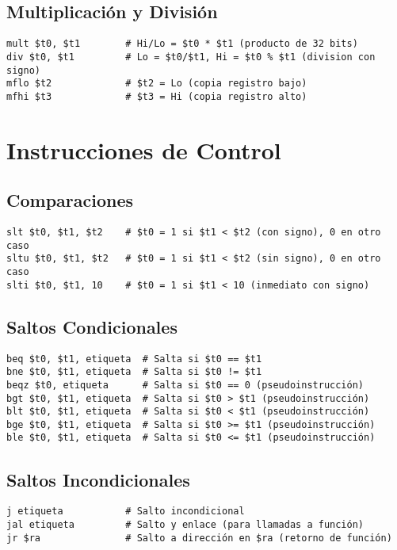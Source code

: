 \documentclass{article}
\begin{document}
\subsection{Multiplicación y División}
\begin{lstlisting}[language={[mips]Assembler}]
mult $t0, $t1        # Hi/Lo = $t0 * $t1 (producto de 32 bits)
div $t0, $t1         # Lo = $t0/$t1, Hi = $t0 % $t1 (division con signo)
mflo $t2             # $t2 = Lo (copia registro bajo)
mfhi $t3             # $t3 = Hi (copia registro alto)
\end{lstlisting}

\section{Instrucciones de Control}

\subsection{Comparaciones}
\begin{lstlisting}[language={[mips]Assembler}]
slt $t0, $t1, $t2    # $t0 = 1 si $t1 < $t2 (con signo), 0 en otro caso
sltu $t0, $t1, $t2   # $t0 = 1 si $t1 < $t2 (sin signo), 0 en otro caso
slti $t0, $t1, 10    # $t0 = 1 si $t1 < 10 (inmediato con signo)
\end{lstlisting}

\subsection{Saltos Condicionales}
\begin{lstlisting}[language={[mips]Assembler}]
beq $t0, $t1, etiqueta  # Salta si $t0 == $t1
bne $t0, $t1, etiqueta  # Salta si $t0 != $t1
beqz $t0, etiqueta      # Salta si $t0 == 0 (pseudoinstrucción)
bgt $t0, $t1, etiqueta  # Salta si $t0 > $t1 (pseudoinstrucción)
blt $t0, $t1, etiqueta  # Salta si $t0 < $t1 (pseudoinstrucción)
bge $t0, $t1, etiqueta  # Salta si $t0 >= $t1 (pseudoinstrucción)
ble $t0, $t1, etiqueta  # Salta si $t0 <= $t1 (pseudoinstrucción)
\end{lstlisting}

\subsection{Saltos Incondicionales}
\begin{lstlisting}[language={[mips]Assembler}]
j etiqueta           # Salto incondicional
jal etiqueta         # Salto y enlace (para llamadas a función)
jr $ra               # Salto a dirección en $ra (retorno de función)
\end{lstlisting}
\end{document}
